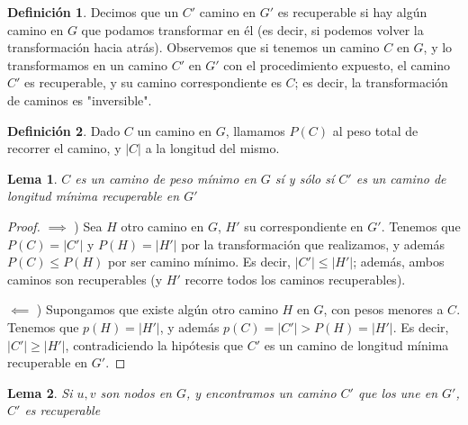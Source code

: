 \documentclass{article}
\newtheorem{lemma}{Lema}[theorem]
\theoremstyle{definition}
\newtheorem{definition}{Definición}[section]
\theoremstyle{remark}
\begin{document}
\begin{definition}
Decimos que un $C'$ camino en $G'$ es recuperable si hay algún camino en $G$ que podamos transformar en él (es decir, si podemos volver la transformación hacia atrás). Observemos que si tenemos un camino $C$ en $G$, y lo transformamos en un camino $C'$ en $G'$ con el procedimiento expuesto, el camino $C'$ es recuperable, y su camino correspondiente es $C$; es decir, la transformación de caminos es "inversible".
\end{definition}

\begin{definition}
Dado $C$ un camino en $G$, llamamos $P(C)$ al peso total de recorrer el camino, y $|C|$ a la longitud del mismo.
\end{definition}

\begin{lemma}
$C$ es un camino de peso mínimo en $G$ sí y sólo sí $C'$ es un camino de longitud mínima recuperable en $G'$
\end{lemma}

\begin{proof}

$\implies$ ) Sea $H$ otro camino en $G$, $H'$ su correspondiente en $G'$. Tenemos que $P(C) = |C'|$ y $P(H) = |H'|$ por la transformación que realizamos, y además $P(C) \leq P(H)$ por ser camino mínimo. Es decir, $|C'| \leq |H'|$; además, ambos caminos son recuperables (y $H'$ recorre todos los caminos recuperables).

$\impliedby$ ) Supongamos que existe algún otro camino $H$ en $G$, con pesos menores a $C$. Tenemos que $p(H) = |H'|$, y además $p(C) = |C'| > P(H) = |H'|$. Es decir, $|C'| \geq |H'|$, contradiciendo la hipótesis que $C'$ es un camino de longitud mínima recuperable en $G'$.
\end{proof}

\begin{lemma}
Si $u, v$ son nodos en $G$, y encontramos un camino $C'$ que los une en $G'$, $C'$ es recuperable
\end{lemma}
\end{document}
